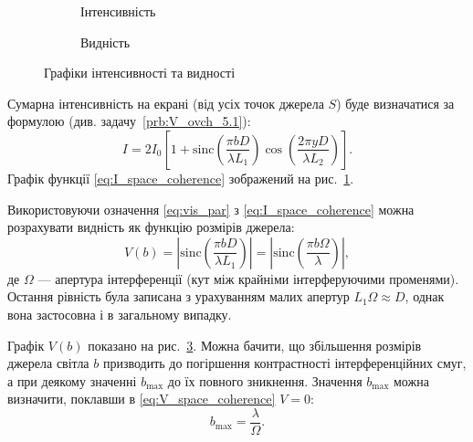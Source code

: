 \begin{figure}[h!]\centering
    \begin{subfigure}{0.49\linewidth}\centering
        
        \caption{Інтенсивність}
        \label{pic:I(y)_space_coherence}
    \end{subfigure}
    \begin{subfigure}{0.49\linewidth}\centering
        
        \caption{Видність}
        \label{pic:V(b)_space_coherence}
    \end{subfigure}
\caption{Графіки інтенсивності та видності}
\end{figure}


Сумарна інтенсивність на екрані (від усіх точок джерела $ S $) буде визначатися за формулою (див. задачу~\ref{prb:V_ovch_5.1}):
\begin{equation}\label{eq:I_space_coherence}
    I = 2I_0\left[ 1 + \mathrm{sinc}\left( \frac{\pi bD}{\lambda L_1}\right) \cos\left( \frac{2\pi yD}{\lambda L_2}\right) \right].
\end{equation}
 Графік функції \eqref{eq:I_space_coherence} зображений на рис.~\ref{pic:I(y)_space_coherence}.

Використовуючи означення \eqref{eq:vis_par} з \eqref{eq:I_space_coherence} можна розрахувати видність як функцію розмірів джерела:
\begin{equation}\label{eq:V_space_coherence}
    V(b) = \left|\mathrm{sinc}\left( \frac{\pi bD}{\lambda L_1}\right) \right| = \left|\mathrm{sinc}\left( \frac{\pi b \Omega}{\lambda}\right) \right|,
\end{equation}
де $ \Omega $ --- апертура інтерференції (кут між крайніми інтерферуючими променями). Остання рівність була записана з урахуванням малих апертур $ L_1\Omega \approx D $, однак вона застосовна і в загальному випадку.

Графік $ V(b) $ показано на рис.~\ref{pic:V(b)_space_coherence}. Можна бачити, що збільшення розмірів джерела світла $ b $ призводить до погіршення контрастності інтерференційних смуг, а при деякому значенні $ b_{\max} $ до їх повного зникнення. Значення $ b_{\max} $ можна визначити, поклавши в \eqref{eq:V_space_coherence} $ V = 0 $:
\begin{equation}\label{eq:b_max}
    b_{\max} = \frac{\lambda}{\Omega}.
\end{equation}

